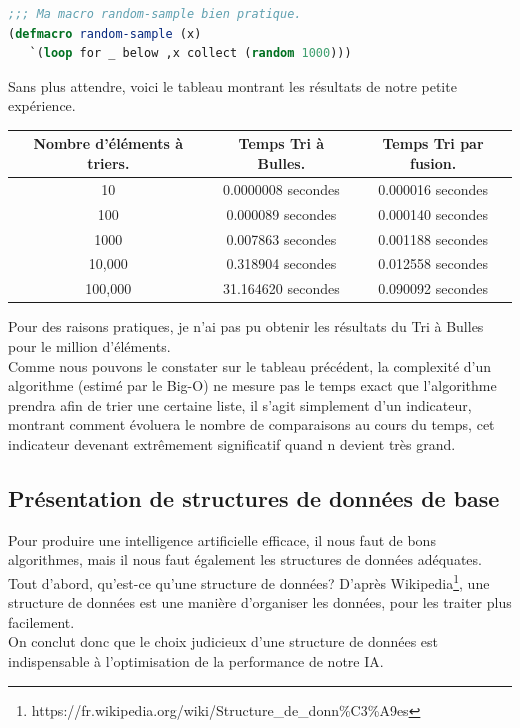 \documentclass[a4paper, 12pt]{article}
\numberwithin{equation}{subsection}
\begin{document}
\begin{lstlisting}[language=Lisp]
;;; Ma macro random-sample bien pratique.
(defmacro random-sample (x)
   `(loop for _ below ,x collect (random 1000)))
\end{lstlisting}
Sans plus attendre, voici le tableau montrant les résultats de notre petite expérience.
\begin{table}[H]
  \begin{tabular}{|c|c|c|}
    \hline {\bf Nombre d'éléments à triers.} & {\bf Temps Tri à Bulles.} & {\bf Temps Tri par fusion.} \\
    \hline 10 & 0.0000008 secondes & 0.000016 secondes \\
    100 & 0.000089 secondes & 0.000140 secondes \\
    1000 & 0.007863 secondes & 0.001188 secondes \\
    10,000 & 0.318904 secondes & 0.012558 secondes \\
    100,000 & 31.164620 secondes & 0.090092 secondes \\
    \hline
  \end{tabular}
\end{table} \smallskip
Pour des raisons pratiques, je n'ai pas pu obtenir les résultats du Tri à Bulles pour le million d'éléments. \\

Comme nous pouvons le constater sur le tableau précédent, la complexité d'un algorithme (estimé par le Big-O) ne mesure pas le temps exact que l'algorithme prendra afin de trier une certaine liste, il s'agit simplement d'un indicateur, montrant comment évoluera le nombre de comparaisons au cours du temps, cet indicateur devenant extrêmement significatif quand n devient très grand. \\[0.5cm]
\subsection{Présentation de structures de données de base}
Pour produire une intelligence artificielle efficace, il nous faut de bons algorithmes, mais il nous faut également les structures de données adéquates. \\

Tout d'abord, qu'est-ce qu'une structure de données?
D'après Wikipedia\footnote{https://fr.wikipedia.org/wiki/Structure\_de\_donn\%C3\%A9es}, une structure de données est une manière d'organiser les données, pour les traiter plus facilement. \\
On conclut donc que le choix judicieux d'une structure de données est indispensable à l'optimisation de la performance de notre IA.
\end{document}
